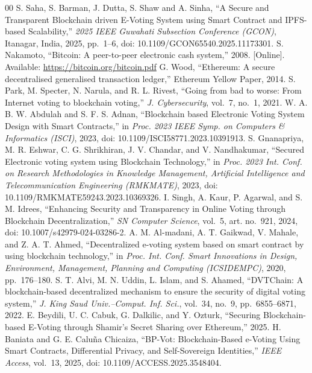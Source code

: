 \documentclass[conference]{IEEEtran}
\begin{document}
\begin{thebibliography}{00}
 S. Saha, S. Barman, J. Dutta, S. Shaw and A. Sinha, ``A Secure and Transparent Blockchain driven E-Voting System using Smart Contract and IPFS-based Scalability,'' \emph{2025 IEEE Guwahati Subsection Conference (GCON)}, Itanagar, India, 2025, pp.~1--6, doi: 10.1109/GCON65540.2025.11173301.
 S. Nakamoto, ``Bitcoin: A peer-to-peer electronic cash system,'' 2008. [Online]. Available: \url{https://bitcoin.org/bitcoin.pdf}
 G. Wood, ``Ethereum: A secure decentralised generalised transaction ledger,'' Ethereum Yellow Paper, 2014.
 S. Park, M. Specter, N. Narula, and R. L. Rivest, ``Going from bad to worse: From Internet voting to blockchain voting,'' \emph{J. Cybersecurity}, vol.~7, no.~1, 2021.
 W. A. B. W. Abdulah and S. F. S. Adnan, ``Blockchain based Electronic Voting System Design with Smart Contracts,'' in \emph{Proc. 2023 IEEE Symp. on Computers \& Informatics (ISCI)}, 2023, doi: 10.1109/ISCI58771.2023.10391913.
 S. Gnanapriya, M. R. Eshwar, C. G. Shrikhiran, J. V. Chandar, and V. Nandhakumar, ``Secured Electronic voting system using Blockchain Technology,'' in \emph{Proc. 2023 Int. Conf. on Research Methodologies in Knowledge Management, Artificial Intelligence and Telecommunication Engineering (RMKMATE)}, 2023, doi: 10.1109/RMKMATE59243.2023.10369326.
 I. Singh, A. Kaur, P. Agarwal, and S. M. Idrees, ``Enhancing Security and Transparency in Online Voting through Blockchain Decentralization,'' \emph{SN Computer Science}, vol.~5, art. no.~921, 2024, doi: 10.1007/s42979-024-03286-2.
 A. M. Al-madani, A. T. Gaikwad, V. Mahale, and Z. A. T. Ahmed, ``Decentralized e-voting system based on smart contract by using blockchain technology,'' in \emph{Proc. Int. Conf. Smart Innovations in Design, Environment, Management, Planning and Computing (ICSIDEMPC)}, 2020, pp.~176--180.
 S. T. Alvi, M. N. Uddin, L. Islam, and S. Ahamed, ``DVTChain: A blockchain-based decentralized mechanism to ensure the security of digital voting system,'' \emph{J. King Saud Univ.--Comput. Inf. Sci.}, vol.~34, no.~9, pp.~6855--6871, 2022.
 E. Beydili, U. C. Cabuk, G. Dalkilic, and Y. Ozturk, ``Securing Blockchain-based E-Voting through Shamir's Secret Sharing over Ethereum,'' 2025.
 H. Baniata and G. E. Calu\~{n}a Chicaiza, ``BP-Vot: Blockchain-Based e-Voting Using Smart Contracts, Differential Privacy, and Self-Sovereign Identities,'' \emph{IEEE Access}, vol.~13, 2025, doi: 10.1109/ACCESS.2025.3548404.

\end{thebibliography}
\end{document}
